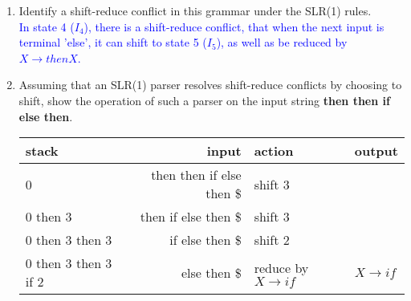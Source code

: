 \documentclass[10pt]{exam}
\begin{document}
\begin{enumerate}
\begin{enumerate}
{\begin{center}
\end{center}
                }
          \item Identify a shift-reduce conflict in this grammar under the
                SLR(1) rules.\\
                \textcolor{blue}{
                  In state 4 ($I_4$), there is a shift-reduce conflict, that when the next input is terminal 'else', it can shift to state 5 ($I_5$), as well as be reduced by $X\rightarrow thenX$.
                }
          \item Assuming that an SLR(1) parser resolves shift-reduce conflicts
                by choosing to shift, show the operation of such a parser on the input
                string \textbf{then then if else then}.\\
                \textcolor{blue}{
                  \begin{tabular}{l r l l}
                    stack                             & input                     & action                      & output            \\
                    \hline
                    0                                 & then then if else then \$ & shift 3                     &                   \\
                    0 then 3                          & then if else then \$      & shift 3                     &                   \\
                    0 then 3 then 3                   & if else then \$           & shift 2                     &                   \\
                    0 then 3 then 3 if 2              & else then \$              & reduce by $X\rightarrow if$ & $X\rightarrow if$ \\

\end{tabular}}
\end{enumerate}
\end{enumerate}
\end{document}
